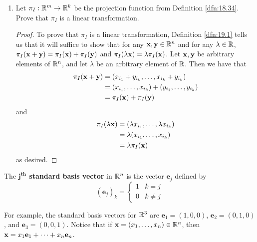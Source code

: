 \documentclass[../main.tex]{subfiles}
\begin{document}
\begin{exercise}
\begin{enumerate}[label={(\alph*)}]
\begin{proof}
\begin{align*}
            \end{align*}
            as desired.
        \end{proof}
        \item Let $\pi_I:\mathbb{R}^m\to\mathbb{R}^k$ be the projection function from Definition \ref{dfn:18.34}. Prove that $\pi_I$ is a linear transformation.
        \begin{proof}
            To prove that $\pi_I$ is a linear transformation, Definition \ref{dfn:19.1} tells us that it will suffice to show that for any $\mathbf{x},\mathbf{y}\in\mathbb{R}^n$ and for any $\lambda\in\mathbb{R}$, $\pi_I(\mathbf{x}+\mathbf{y})=\pi_I(\mathbf{x})+\pi_I(\mathbf{y})$ and $\pi_I(\lambda\mathbf{x})=\lambda\pi_I(\mathbf{x})$. Let $\mathbf{x},\mathbf{y}$ be arbitrary elements of $\mathbb{R}^n$, and let $\lambda$ be an arbitrary element of $\mathbb{R}$. Then we have that
            \begin{align*}
                \pi_I(\mathbf{x}+\mathbf{y}) &= (x_{i_1}+y_{i_k},\dots,x_{i_k}+y_{i_k})\\
                &= (x_{i_1},\dots,x_{i_k})+(y_{i_1},\dots,y_{i_k})\\
                &= \pi_I(\mathbf{x})+\pi_I(\mathbf{y})
            \end{align*}
            and
            \begin{align*}
                \pi_I(\lambda\mathbf{x}) &= (\lambda x_{i_1},\dots,\lambda x_{i_k})\\
                &= \lambda(x_{i_1},\dots,x_{i_k})\\
                &= \lambda\pi_I(\mathbf{x})
            \end{align*}
            as desired.
        \end{proof}
    \end{enumerate}
\end{exercise}

\begin{definition}\label{dfn:19.6}
    The \textbf{$\bm{j^\text{th}}$ standard basis vector} in $\mathbb{R}^n$ is the vector $\mathbf{e}_j$ defined by
    \begin{equation*}
        (\mathbf{e}_j)_k =
        \begin{cases}
            1 & k=j\\
            0 & k\neq j
        \end{cases}
    \end{equation*}
\end{definition}

For example, the standard basis vectors for $\mathbb{R}^3$ are $\mathbf{e}_1=(1,0,0)$, $\mathbf{e}_2=(0,1,0)$, and $\mathbf{e}_3=(0,0,1)$. Notice that if $\mathbf{x}=(x_1,\dots,x_n)\in\mathbb{R}^n$, then $\mathbf{x}=x_1\mathbf{e}_1+\cdots+x_n\mathbf{e}_n$.
\end{document}
